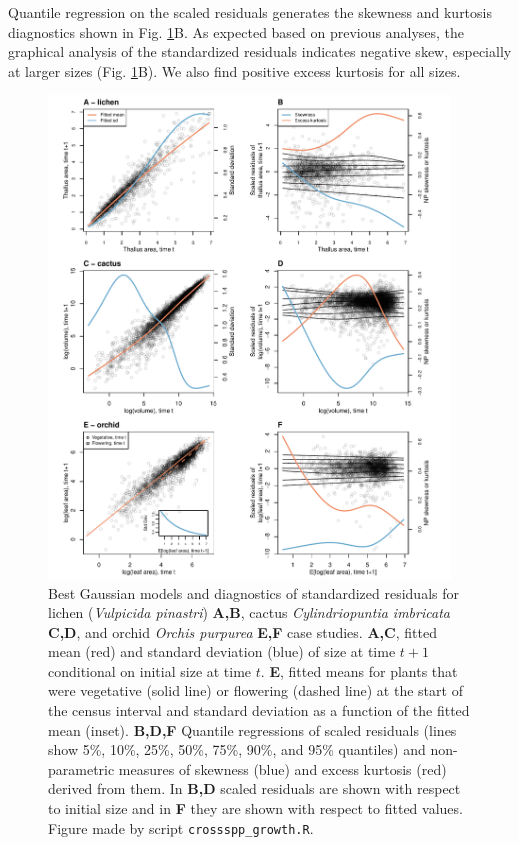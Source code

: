 \documentclass[12pt]{article}
\begin{document}
\begin{spacing}{1.9}
Quantile regression on the scaled residuals generates the skewness and kurtosis diagnostics shown in Fig. \ref{fig:resid_diagnostics}B.
As expected based on previous analyses, the graphical analysis of the standardized residuals indicates negative skew, especially at larger sizes (Fig. \ref{fig:resid_diagnostics}B).
We also find positive excess kurtosis for all sizes. 

\begin{figure}[tbp]
	\centering
	\includegraphics[width=0.95\textwidth]{figures/combo_resid_diagnostics.pdf}
	\caption{Best Gaussian models and diagnostics of standardized residuals for lichen (\emph{Vulpicida pinastri}) \textbf{A,B}, cactus \emph{Cylindriopuntia imbricata} \textbf{C,D}, and orchid \emph{Orchis purpurea} \textbf{E,F} case studies. \textbf{A,C}, fitted mean (red) and standard deviation (blue) of size at time $t+1$ conditional on initial size at time $t$. \textbf{E}, fitted means for plants that were vegetative (solid line) or flowering (dashed line) at the start of the census interval and standard deviation as a function of the fitted mean (inset). \textbf{B,D,F} Quantile regressions of scaled residuals (lines show 5\%, 10\%, 25\%, 50\%, 75\%, 90\%, and 95\% quantiles) and non-parametric measures of skewness (blue) and excess kurtosis (red) derived from them. In \textbf{B,D} scaled residuals are shown with respect to initial size and in \textbf{F} they are shown with respect to fitted values. Figure made by script \texttt{crossspp\_growth.R}.}
	\label{fig:resid_diagnostics}
\end{figure}


\end{spacing}
\end{document}
